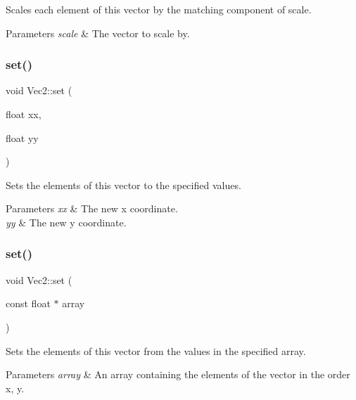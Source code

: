 Scales each element of this vector by the matching component of scale.


\begin{DoxyParams}{Parameters}
{\em scale} & The vector to scale by. \\
\hline
\end{DoxyParams}
\mbox{\label{classVec2_a74b21ca56da0a8db13168c627929ffd0}} 
\subsubsection{\texorpdfstring{set()}{set()}\hspace{0.1cm}{\footnotesize\ttfamily [1/8]}}
{\footnotesize\ttfamily void Vec2\+::set (\begin{DoxyParamCaption}\item[{float}]{xx,  }\item[{float}]{yy }\end{DoxyParamCaption})\hspace{0.3cm}{\ttfamily [inline]}}

Sets the elements of this vector to the specified values.


\begin{DoxyParams}{Parameters}
{\em xx} & The new x coordinate. \\
\hline
{\em yy} & The new y coordinate. \\
\hline
\end{DoxyParams}
\mbox{\label{classVec2_a492bf35fe6975aebe475519f21d86364}} 
\subsubsection{\texorpdfstring{set()}{set()}\hspace{0.1cm}{\footnotesize\ttfamily [2/8]}}
{\footnotesize\ttfamily void Vec2\+::set (\begin{DoxyParamCaption}\item[{const float $\ast$}]{array }\end{DoxyParamCaption})}

Sets the elements of this vector from the values in the specified array.


\begin{DoxyParams}{Parameters}
{\em array} & An array containing the elements of the vector in the order x, y. \\
\hline
\end{DoxyParams}
\mbox{\label{classVec2_a74b21ca56da0a8db13168c627929ffd0}} 

